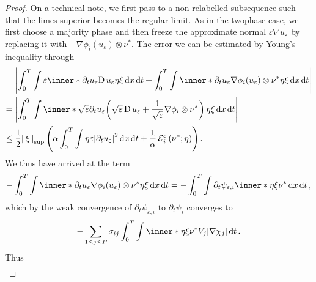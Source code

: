 \begin{proof}
	On a technical note, we first pass to a non-relabelled subsequence such 
	that the limes superior becomes the regular limit.
	As in the twophase case, we first choose a majority phase and then freeze 
	the approximate normal $ \varepsilon \nabla u_{ \varepsilon } $ by 
	replacing it with $ - \nabla \phi_{ i } ( u_{ \varepsilon } ) \otimes \nu^{ 
	\ast } $. The error we can be estimated by Young's inequality through
	\begin{align}
		\notag
		& \abs{
			\int_{ 0 }^{ T }
			\int
			\varepsilon
			\inner*{ \partial_{  t } u_{ 
					\varepsilon } }{ \diff u_{ \varepsilon } \eta \xi }
			\dd{ x }
			\dd{ t }
			+
			\int_{ 0 }^{ T }
			\int
			\inner*{ \partial_{ t } u_{ \varepsilon } }{ \nabla \phi_{ 
					i } ( u_{ \varepsilon } ) \otimes 
				\nu^{ \ast } \eta\xi }
			\dd{ x }
			\dd{ t }
		}
		\\
		\notag
		={} &
		\abs{
			\int_{ 0 }^{ T }
			\int
			\inner*
			{ 
				\sqrt{ \varepsilon } \partial_{ t } u_{ \varepsilon } }{ 
				\left(
				\sqrt{ \varepsilon } \diff u_{ \varepsilon }
				+
				\frac{ 1 }{ \sqrt{ \varepsilon } }
				\nabla \phi_{ i } \otimes \nu^{ \ast } 
				\right)
				\eta \xi 
			}
			\dd{ x }
			\dd{ t }
		}
		\\
		\label{first_error_for_velocity}
		\leq{} &
		\frac{ 1 }{ 2 }
		\norm{ \xi }_{ \mathrm{sup} }
		\left(
		\alpha 
		\int_{ 0 }^{ T }
		\int
		\eta \varepsilon 
		\abs{ \partial_{ t } u_{ \varepsilon } }^{ 2 }
		\dd{ x }
		\dd{ t }
		+
		\frac{ 1 }{ \alpha }
		\tilt_excess_{ i }^{ \varepsilon } \left( \nu^{ \ast } ; \eta \right)
		\right).
	\end{align}
	We thus have arrived at the term
	\begin{equation*}
		- \int_{ 0 }^{ T }
		\int
		\inner*{ \partial_{ t } u_{ \varepsilon } }{ \nabla \phi_{ i } 
			( u_{ \varepsilon } ) \otimes \nu^{ 
				\ast } \eta \xi }
		\dd{ x }
		\dd{ t }
		= 
		- \int_{ 0 }^{ T }
		\int
		\partial_{ t } \psi_{ \varepsilon , i }
		\inner*{ \eta \xi }{ \nu^{ \ast } }
		\dd{ x }
		\dd{ t },
	\end{equation*} 
	which by the weak convergence of $ \partial_{ t } \psi_{ \varepsilon,  i } 
	$ to $ \partial_{ t } \psi_{ i } $ converges to
	\begin{equation*}
		- \sum_{ 1 \leq j \leq P }
		\sigma_{ i j }
		\int_{ 0 }^{ T }
		\int
		\inner*{ \eta \xi }{ \nu^{ \ast } }
		V_{ j }
		\abs{ \nabla \chi_{ j } }
		\dd{ t }.
	\end{equation*}
	Thus
	\begin{align*}

\end{align*}
\end{proof}
